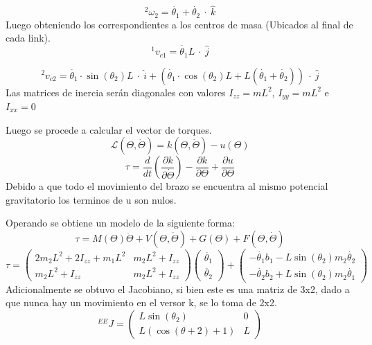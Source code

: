 \begin{equation}
^2\omega_2= \dot{\theta_1}+\dot{\theta_2}  \ \cdot \ \hat{k}
\end{equation}
Luego obteniendo los correspondientes a los centros de masa (Ubicados al final de cada link).
\begin{equation}
^1v_{c1}=\dot{\theta_1}L \ \cdot \  \hat{j}
\end{equation}

\begin{equation}
^2v_{c2}=\dot{\theta_1} \cdot \sin(\theta_2)L  \ \cdot \ \hat{i} + \left( \dot{\theta_1} \cdot \cos(\theta_2)L  + L( \dot{\theta_1}+\dot{\theta_2} ) \right) \ \cdot \  \hat{j}
\end{equation}
Las matrices de inercia ser\'an diagonales con valores $I_{zz}=mL^2$, $I_{yy}=mL^2$ e $I_{xx}=0$


Luego se procede a calcular el vector de torques.
\begin{equation}
\mathcal{L}(\Theta , \dot{\Theta}) = k(\Theta , \dot{\Theta}) - u(\Theta)
\end{equation}
\begin{equation}
\tau = \frac{d}{dt}\left(\frac{\partial k}{\partial \dot{\Theta}} \right) - \frac{\partial k}{\partial \Theta} + \frac{\partial u}{\partial \Theta}
\end{equation}
Debido a que todo el movimiento del brazo se encuentra al mismo potencial gravitatorio los terminos de u son nulos.


Operando se obtiene un modelo de la siguiente forma:
\begin{equation}
\tau =  M(\Theta) \ddot{\Theta} + V(\Theta , \dot{\Theta}) + G(\Theta) + F(\Theta , \dot{\Theta})
\end{equation}
\begin{equation}
\tau = \begin{pmatrix}
2m_2L^2+2I_{zz}+m_1L^2 & m_2L^2+I_{zz}\\
m_2L^2+I_{zz} & m_2L^2+I_{zz}
\end{pmatrix} 
\begin{pmatrix}
\ddot{\theta_1} \\ 
\ddot{\theta_2}
\end{pmatrix}
+
\begin{pmatrix}
-\dot{\theta_1}b_1-L\sin(\theta_2)m_2\dot{\theta_2} \\ 
-\dot{\theta_2}b_2+L\sin(\theta_2)m_2\dot{\theta_1}
\end{pmatrix}
\end{equation}
Adicionalmente se obtuvo el Jacobiano, si bien este es una matriz de 3x2, dado a que nunca hay un movimiento en el versor k, se lo toma de 2x2.
\begin{equation}
^{EE}J=\begin{pmatrix}
L\sin(\theta_2) & 0 \\
L(\cos(\theta+2)+1) & L
\end{pmatrix}
\end{equation}
%
